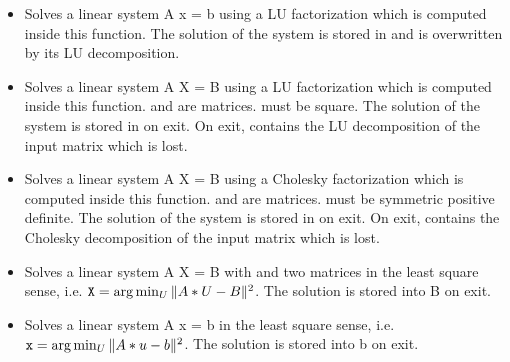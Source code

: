 \begin{itemize}
\item {} 
  \sshortdescribe Solves a linear system A x = b using a LU factorization
  which is computed inside this function. The solution of the system is stored
  in  and  is overwritten by its LU decomposition.

\item {} 
  \sshortdescribe Solves a linear system A X = B using a LU factorization
  which is computed inside this function.  and   are
  matrices.  must be square. The solution of the system is stored in
   on exit. On exit,  contains the LU decomposition of the input
  matrix which is lost.

\item {}
  \sshortdescribe Solves a linear system A X = B
  using a Cholesky factorization which is computed inside this
  function.  and  are matrices.  must be symmetric
  positive definite. The solution of the system is stored in  on
  exit. On exit,  contains the Cholesky decomposition of the input
  matrix which is lost.

\item {}
  \sshortdescribe Solves a linear system A X = B with  and  two
  matrices in the least square sense, i.e. ${\tt X} = \arg\min_U \| A * U -
  B\|^2$. The solution is stored into B on exit.

\item {}
  \sshortdescribe Solves a linear system A x = b in the least square sense,
  i.e. ${\tt x} = \arg\min_U \| A * u - b\|^2$. The solution is stored into b
  on exit.
\end{itemize}


